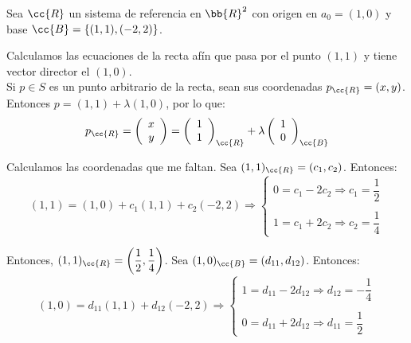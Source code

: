 \begin{ejemplo}
    Sea $\cc{R}$ un sistema de referencia en $\bb{R}^2$ con origen en $a_0=(1,0)$ y base $\cc{B}=\{(1,1), (-2,2)\}$.

    Calculamos las ecuaciones de la recta afín que pasa por el punto $(1,1)$ y tiene vector director el $(1,0)$.\\

    Si $p\in S$ es un punto arbitrario de la recta, sean sus coordenadas $p_{\cc{R}}=(x,y)$. Entonces $p=(1,1)+\lambda (1,0)$, por lo que:
    \begin{equation*}
        p_{\cc{R}}=
        \left(\begin{array}{c}
            x \\ y
        \end{array}\right)
        = \left(\begin{array}{c}
            1 \\ 1
        \end{array}\right)_{\cc{R}}
        +\lambda \left(\begin{array}{c}
            1 \\ 0
        \end{array}\right)_{\cc{B}}
    \end{equation*}

    Calculamos las coordenadas que me faltan. Sea $(1,1)_{\cc{R}}=(c_1,c_2)$. Entonces:
    \begin{equation*}
        (1,1)=(1,0) + c_1(1,1) + c_2(-2,2) \Longrightarrow
        \left\{
        \begin{array}{l}
            0 = c_1-2c_2\Longrightarrow c_1=\dfrac{1}{2}\\ \\
            1 = c_1 +2c_2 \Longrightarrow c_2=\dfrac{1}{4}
        \end{array}
        \right.
    \end{equation*}

    Entonces, $(1,1)_{\cc{R}}=\left(\dfrac{1}{2},\dfrac{1}{4}\right)$. Sea $(1,0)_{\cc{B}}=(d_{11},d_{12})$. Entonces:
    \begin{equation*}
        (1,0)=d_{11}(1,1) + d_{12}(-2,2) \Longrightarrow
        \left\{
        \begin{array}{l}
            1 = d_{11}-2d_{12}\Longrightarrow d_{12}=-\dfrac{1}{4}\\ \\
            0 = d_{11} +2d_{12} \Longrightarrow d_{11}=\dfrac{1}{2}
        \end{array}
        \right.
    \end{equation*}


\end{ejemplo}
